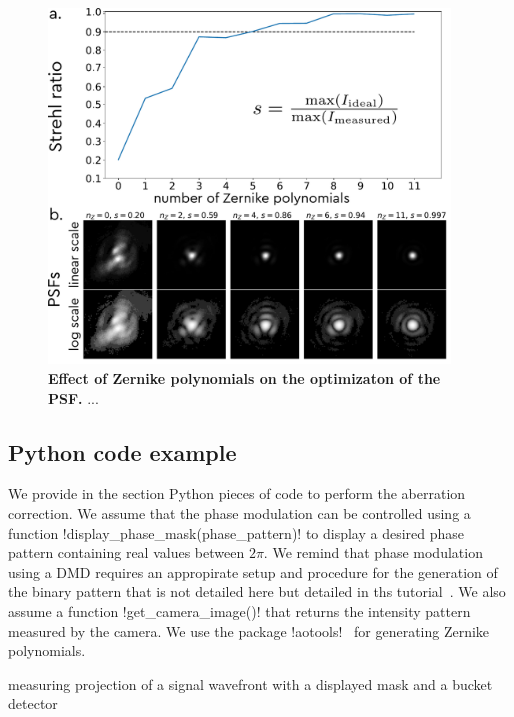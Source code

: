 \documentclass[12pt]{iopart}
\begin{document}
\begin{figure}
  \centering
  \includegraphics[width = 0.95\textwidth]{images/Zernike_2.pdf}
  \caption{
  \textbf{Effect of Zernike polynomials on the optimizaton of the PSF.}
 ...
  }
  \label{fig:zernike}
\end{figure}


\subsection{Python code example}

We provide in the section Python pieces of code to perform the aberration correction.
We assume that the phase modulation can be controlled using a function 
!display_phase_mask(phase_pattern)! to display a desired phase pattern 
containing real values between $2\pi$.
We remind that phase modulation using a DMD requires an appropirate setup 
and procedure for the generation of the binary pattern that is not detailed here 
but detailed in ths tutorial~\cite{RODRIGO}.
We also assume a function !get_camera_image()! 
that returns the intensity pattern measured by the camera. 
We use the package !aotools!~\cite{Townson2019aotools} for generating Zernike polynomials.

% 
  

measuring projection of a signal wavefront with a displayed mask and a bucket detector~\cite{}  


\cite{Lee1979binary}
\end{document}
